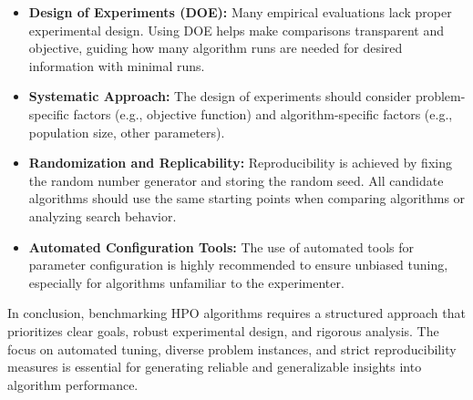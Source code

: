 
\begin{itemize}[leftmargin=*,itemsep=0.4em]
  \item \textbf{Design of Experiments (DOE):} Many empirical evaluations lack proper experimental design. Using DOE helps make comparisons transparent and objective, guiding how many algorithm runs are needed for desired information with minimal runs.
  \item \textbf{Systematic Approach:} The design of experiments should consider problem-specific factors (e.g., objective function) and algorithm-specific factors (e.g., population size, other parameters).
  \item \textbf{Randomization and Replicability:} Reproducibility is achieved by fixing the random number generator and storing the random seed. All candidate algorithms should use the same starting points when comparing algorithms or analyzing search behavior.
  \item \textbf{Automated Configuration Tools:} The use of automated tools for parameter configuration is highly recommended to ensure unbiased tuning, especially for algorithms unfamiliar to the experimenter.
\end{itemize}

In conclusion, benchmarking HPO algorithms requires a structured approach that prioritizes clear goals, robust experimental design, and rigorous analysis. The focus on automated tuning, diverse problem instances, and strict reproducibility measures is essential for generating reliable and generalizable insights into algorithm performance.
